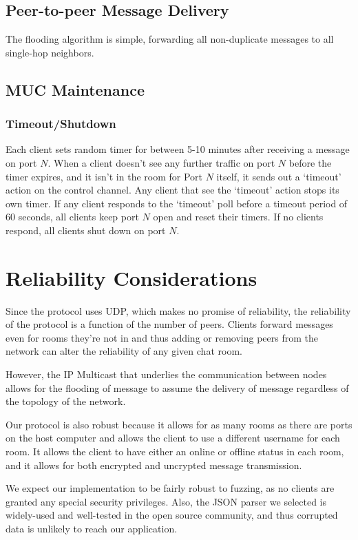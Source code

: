 \documentclass{article}
\begin{document}
\subsection{Peer-to-peer Message Delivery}

The flooding algorithm is simple, forwarding all non-duplicate messages to all
single-hop neighbors.

\subsection{MUC Maintenance}

\subsubsection{Timeout/Shutdown}

Each client sets random timer for between 5-10 minutes after receiving a message
on port $N$. When a client doesn't see any further traffic on port $N$ before the
timer expires, and it isn't in the room for Port $N$ itself, it sends out a
`timeout' action on the control channel. Any client that see the `timeout'
action stops its own timer. If any client responds to the `timeout' poll before
a timeout period of 60 seconds, all clients keep port $N$ open and reset their
timers. If no clients
respond, all clients shut down on port $N$.

\section{Reliability Considerations}

Since the protocol uses UDP, which makes no promise of reliability, the
reliability of the protocol is a function of the number of peers. Clients
forward messages even for rooms they're not in and thus adding or removing peers
from the network can alter the reliability of any given chat room.

However, the IP Multicast that underlies the communication between nodes allows
for the flooding of message to assume the delivery of message regardless of the
topology of the network.

Our protocol is also robust because it allows for as many rooms as there are
ports on the host computer and allows the client to use a different username for
each room.  It allows the client to have either an online or offline status in
each room, and it allows for both encrypted and uncrypted message transmission. 

We expect our implementation to be fairly robust to fuzzing, as no clients are
granted any special security privileges. Also, the JSON parser we selected is
widely-used and well-tested in the open source community, and thus corrupted
data is unlikely to reach our application.  
\end{document}
